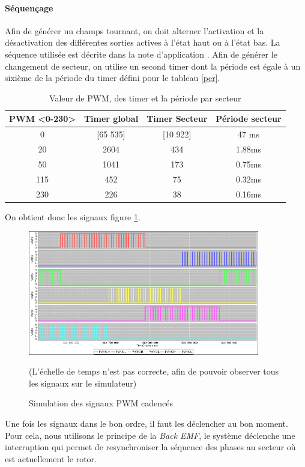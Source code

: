   			\paragraph{Séquençage}
  			Afin de générer un champs tournant, on doit alterner l'activation et la désactivation des différentes sorties actives à l'état haut ou à l'état bas. La séquence utilisée est décrite dans la note d'application \cite{AN857}. Afin de générer le changement de secteur, on utilise un second timer dont la période est égale à un sixième de la période du timer défini pour le tableau \ref{per}.
  			\begin{table}[h]
			\centering
			\begin{center}
			\begin{tabular}{|c|c|c|c|}
			PWM <0-230> & Timer global & Timer Secteur &  Période secteur \\ 
			\hline 
			0 & [65 535]&[10 922]& 47 ms\\ 
			20 &  2604 &434 &1.88ms\\ 
			50 &  1041& 173&0.75ms\\ 
			115 &  452& 75&0.32ms\\ 
			230 &  226& 38&0.16ms\\ 
			\end{tabular} 
			\end{center}
			\caption{Valeur de PWM, des timer et la période par secteur}
			\end{table}
  			On obtient donc les signaux figure \ref{imgPWMCad}.
  			\begin{figure}[h]\begin{center}
	  			\includegraphics[width=0.9\textwidth]{../Illus/PWMCadence2015.png}
	  			\caption{Simulation des signaux PWM cadencés}(L'échelle de temps n'est pas correcte, afin de pouvoir observer tous les signaux sur le simulateur)
	  			\label{imgPWMCad}
	  			\end{center}
  			\end{figure}
  			Une fois les signaux dans le bon ordre, il faut les déclencher au bon moment. Pour cela, nous utilisons le principe de la \textit{Back EMF}, le système déclenche une interruption qui permet de resynchroniser la séquence des phases au secteur où est actuellement le rotor.
